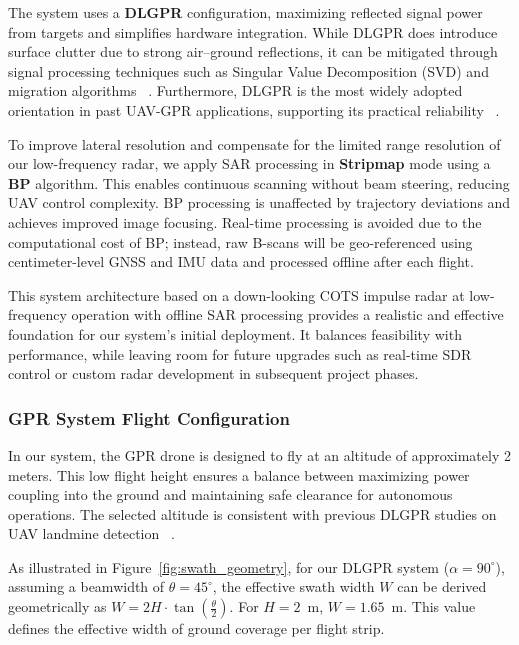 The system uses a \textbf{DLGPR} configuration, maximizing reflected signal power from targets and simplifies hardware integration. While DLGPR does introduce surface clutter due to strong air–ground reflections, it can be mitigated through signal processing techniques such as Singular Value Decomposition (SVD) and migration algorithms ~\cite{garcia2024comparison}. Furthermore, DLGPR is the most widely adopted orientation in past UAV-GPR applications, supporting its practical reliability ~\cite{alqudsi2021review}.

To improve lateral resolution and compensate for the limited range resolution of our low-frequency radar, we apply SAR processing in \textbf{Stripmap} mode using a \textbf{BP} algorithm. This enables continuous scanning without beam steering, reducing UAV control complexity. BP processing is unaffected by trajectory deviations and achieves improved image focusing. Real-time processing is avoided due to the computational cost of BP; instead, raw B-scans will be geo-referenced using centimeter-level GNSS and IMU data and processed offline after each flight.


This system architecture based on a down-looking COTS impulse radar at low-frequency operation with offline SAR processing provides a realistic and effective foundation for our system’s initial deployment. It balances feasibility with performance, while leaving room for future upgrades such as real-time SDR control or custom radar development in subsequent project phases.



\subsubsection{GPR System Flight Configuration}\label{GPR_flight}

In our system, the GPR drone is designed to fly at an altitude of approximately 2 meters. This low flight height ensures a balance between maximizing power coupling into the ground and maintaining safe clearance for autonomous operations. The selected altitude is consistent with previous DLGPR studies on UAV landmine detection ~\cite{schartel2018uav,alqudsi2021review}.

As illustrated in Figure~\ref{fig:swath_geometry}, for our DLGPR system ($\alpha = 90^\circ$), assuming a beamwidth of $\theta = 45^\circ$, the effective swath width $W$ can be derived geometrically as \(W = 2H \cdot \tan\left(\frac{\theta}{2}\right)\). For $H = 2$~m,  $W = 1.65$~m. This value defines the effective width of ground coverage per flight strip.


